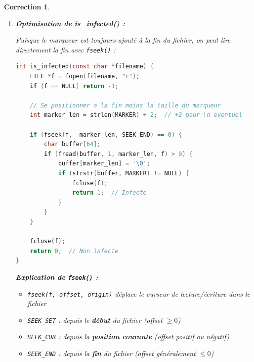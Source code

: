 \documentclass[a4paper,11pt]{article}
\theoremstyle{plain}
\newtheorem{correction}{Correction}
\theoremstyle{definition}
\begin{document}
\begin{correction}
\begin{enumerate}
\textbf{Mode ``w'' (write) :}
\begin{itemize}
\item Efface tout le contenu existant
\item Le fichier est \textbf{vidé} puis réécrit depuis le début
\item Le contenu original est \textbf{détruit}
\item Le programme infecté ne fonctionne plus du tout
\end{itemize}

Un virus doit préserver la fonctionnalité du fichier infecté pour :
\begin{itemize}
\item Rester furtif (l'utilisateur ne remarque rien)
\item Permettre sa propagation (le programme doit s'exécuter)
\end{itemize}

\item \textbf{Optimisation de is\_infected() :}

Puisque le marqueur est toujours ajouté à la fin du fichier, on peut lire directement la fin avec \texttt{fseek()} :

\begin{lstlisting}[language=C]
int is_infected(const char *filename) {
    FILE *f = fopen(filename, "r");
    if (f == NULL) return -1;

    // Se positionner a la fin moins la taille du marqueur
    int marker_len = strlen(MARKER) + 2;  // +2 pour \n eventuel

    if (fseek(f, -marker_len, SEEK_END) == 0) {
        char buffer[64];
        if (fread(buffer, 1, marker_len, f) > 0) {
            buffer[marker_len] = '\0';
            if (strstr(buffer, MARKER) != NULL) {
                fclose(f);
                return 1;  // Infecte
            }
        }
    }

    fclose(f);
    return 0;  // Non infecte
}
\end{lstlisting}

\textbf{Explication de \texttt{fseek()} :}
\begin{itemize}
\item \texttt{fseek(f, offset, origin)} déplace le curseur de lecture/écriture dans le fichier
\item \texttt{SEEK\_SET} : depuis le \textbf{début} du fichier (offset $\geq 0$)
\item \texttt{SEEK\_CUR} : depuis la \textbf{position courante} (offset positif ou négatif)
\item \texttt{SEEK\_END} : depuis la \textbf{fin} du fichier (offset généralement $\leq 0$)
\end{itemize}


\end{enumerate}
\end{correction}
\end{document}
